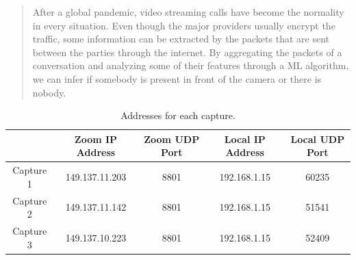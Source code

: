 \documentclass[10pt, conference]{IEEEtran}
\begin{document}
\begin{abstract}
    After a global pandemic, video streaming calls have become the normality in every situation. Even though the major providers usually encrypt the traffic, some information can be extracted by the packets that are sent between the parties through the internet. By aggregating the packets of a conversation and analyzing some of their features through a ML algorithm, we can infer if somebody is present in front of the camera or there is nobody.
\end{abstract}



\begin{table}[t]
    \centering
    \begin{tabular}{| c ||c c c c||}
     \hline
      & Zoom IP Address & Zoom UDP Port & Local IP Address & Local UDP Port \\
     \hline\hline
     Capture 1 & 149.137.11.203 & 8801 & 192.168.1.15 & 60235 \\ 
     \hline
     Capture 2 & 149.137.11.142 & 8801 & 192.168.1.15 & 51541 \\
     \hline
     Capture 3 & 149.137.10.223 & 8801 & 192.168.1.15 & 52409 \\ 
     \hline
    \end{tabular}
    \caption{Addresses for each capture.}
    \label{table:table-addresses}
\end{table}
\end{document}
